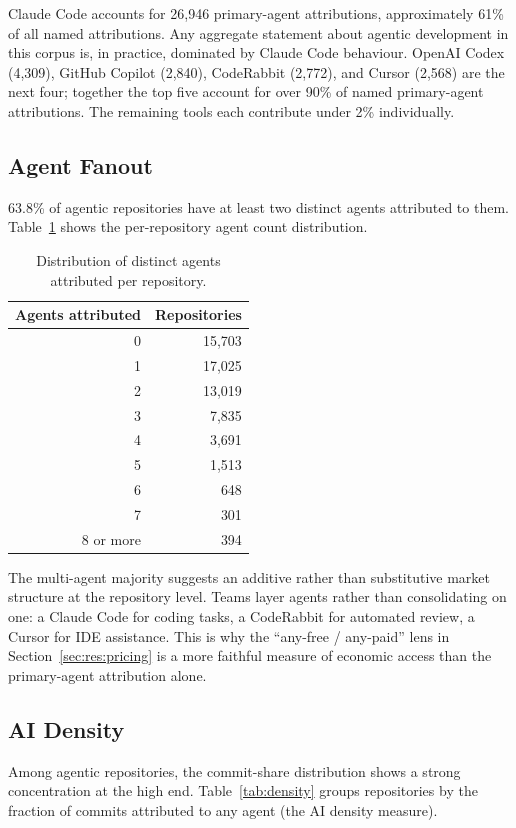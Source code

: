 Claude Code accounts for 26,946 primary-agent attributions, approximately 61\% of all named attributions. Any aggregate statement about agentic development in this corpus is, in practice, dominated by Claude Code behaviour. OpenAI Codex (4,309), GitHub Copilot (2,840), CodeRabbit (2,772), and Cursor (2,568) are the next four; together the top five account for over 90\% of named primary-agent attributions. The remaining tools each contribute under 2\% individually.

\subsection{Agent Fanout}

63.8\% of agentic repositories have at least two distinct agents attributed to them. Table~\ref{tab:fanout} shows the per-repository agent count distribution.

\begin{table}[h]
\centering
\caption{Distribution of distinct agents attributed per repository.}
\label{tab:fanout}
\begin{tabular}{@{}rr@{}}
\toprule
Agents attributed & Repositories \\
\midrule
0 & 15,703 \\
1 & 17,025 \\
2 & 13,019 \\
3 &  7,835 \\
4 &  3,691 \\
5 &  1,513 \\
6 &    648 \\
7 &    301 \\
8 or more &  394 \\
\bottomrule
\end{tabular}
\end{table}

The multi-agent majority suggests an additive rather than substitutive market structure at the repository level. Teams layer agents rather than consolidating on one: a Claude Code for coding tasks, a CodeRabbit for automated review, a Cursor for IDE assistance. This is why the ``any-free / any-paid'' lens in Section~\ref{sec:res:pricing} is a more faithful measure of economic access than the primary-agent attribution alone.

\subsection{AI Density}

Among agentic repositories, the commit-share distribution shows a strong concentration at the high end. Table~\ref{tab:density} groups repositories by the fraction of commits attributed to any agent (the AI density measure).

